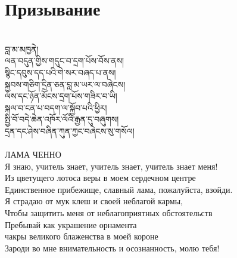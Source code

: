 \section{Призывание}
\\
\ti
བླ་མ་མཁྱནེ།\\
ལན་བདུན་གྱིས་གདུང་བ་དྲག་པོས་བོས་ནས།\\
སྙིང་དབུས་དད་པའི་གེ་སར་བཞད་པ་ནས།\\
སྐྱབས་གཅིག་དྲིན་ཅན་བླ་མ་ཡར་ལ་བཞེངས།\\
ལས་དང་ཉོན་མོངས་དྲག་པོས་གཟིར་བ་ཡི།\\
སྐལ་བ་ངན་པ་བདག་ལ་སྐྱོབ་པའི་ཕྱིར།\\
སྤྱི་བོ་བདེ་ཆེན་འཁོར་ལོའི་རྒྱན་དུ་བཞུགས།\\
དྲན་དང་ཤེས་བཞིན་ཀུན་ཀྱང་བཞེངས་སུ་གསོལ།\\
\\
\ru
ЛАМА ЧЕННО\\
Я знаю, учитель знает, учитель знает, учитель знает меня!\\
Из цветущего лотоса веры в моем сердечном центре \\
Единственное прибежище, славный лама, пожалуйста, взойди.\\
Я страдаю от мук клеш и своей неблагой кармы,\\
Чтобы защитить меня от неблагоприятных обстоятельств\\
Пребывай как украшение орнамента \\
чакры великого блаженства в моей короне \\
Зароди во мне внимательность и осознанность, молю тебя!\\

